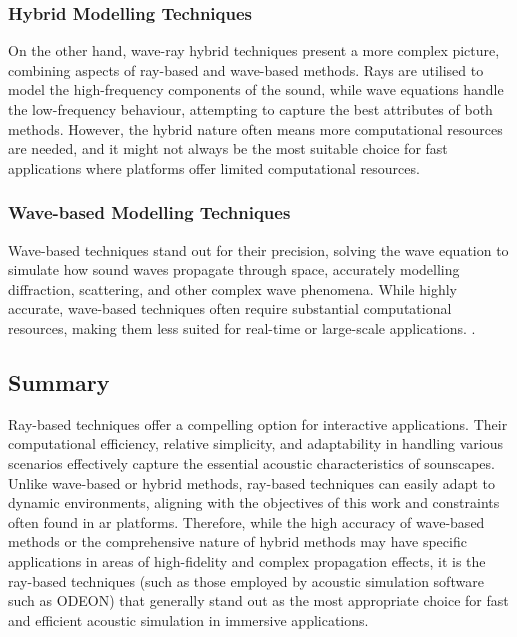 \subsubsection{Hybrid Modelling Techniques}
On the other hand, wave-ray hybrid techniques present a more complex picture, combining aspects of ray-based and wave-based methods. Rays are utilised to model the high-frequency components of the sound, while wave equations handle the low-frequency behaviour, attempting to capture the best attributes of both methods. However, the hybrid nature often means more computational resources are needed, and it might not always be the most suitable choice for fast applications where platforms offer limited computational resources. \cite{hulusic2012acoustic}

\subsubsection{Wave-based Modelling Techniques}
Wave-based techniques stand out for their precision, solving the wave equation to simulate how sound waves propagate through space, accurately modelling diffraction, scattering, and other complex wave phenomena. While highly accurate, wave-based techniques often require substantial computational resources, making them less suited for real-time or large-scale applications. \cite{hamilton2017fdtd, raghuvanshi2014parametric}.\par

\subsection{Summary}
Ray-based techniques offer a compelling option for interactive applications. Their computational efficiency, relative simplicity, and adaptability in handling various scenarios effectively capture the essential acoustic characteristics of sounscapes. Unlike wave-based or hybrid methods, ray-based techniques can easily adapt to dynamic environments, aligning with the objectives of this work and constraints often found in \acrshort{ar} platforms. Therefore, while the high accuracy of wave-based methods or the comprehensive nature of hybrid methods may have specific applications in areas of high-fidelity and complex propagation effects, it is the ray-based techniques (such as those employed by acoustic simulation software such as ODEON) that generally stand out as the most appropriate choice for fast and efficient acoustic simulation in immersive applications.

